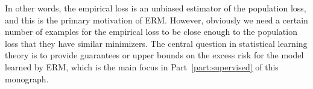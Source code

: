 In other words, the empirical loss is  an unbiased estimator of the population loss, and this is the primary motivation of ERM. However, obviously we need a certain number of examples for the empirical loss to be close enough to the population loss that they have similar minimizers. The central question in statistical learning theory is to provide guarantees or upper bounds on the excess risk for the model learned by ERM, which is the main focus in Part~\ref{part:supervised} of this monograph. 
